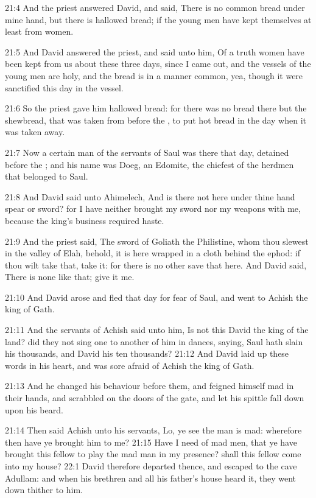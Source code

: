 21:4 And the priest answered David, and said, There is no common bread under mine hand, but there is hallowed bread; if the young men have kept themselves at least from women.

21:5 And David answered the priest, and said unto him, Of a truth women have been kept from us about these three days, since I came out, and the vessels of the young men are holy, and the bread is in a manner common, yea, though it were sanctified this day in the vessel.

21:6 So the priest gave him hallowed bread: for there was no bread there but the shewbread, that was taken from before the \LORD, to put hot bread in the day when it was taken away.

21:7 Now a certain man of the servants of Saul was there that day, detained before the \LORD; and his name was Doeg, an Edomite, the chiefest of the herdmen that belonged to Saul.

21:8 And David said unto Ahimelech, And is there not here under thine hand spear or sword? for I have neither brought my sword nor my weapons with me, because the king's business required haste.

21:9 And the priest said, The sword of Goliath the Philistine, whom thou slewest in the valley of Elah, behold, it is here wrapped in a cloth behind the ephod: if thou wilt take that, take it: for there is no other save that here. And David said, There is none like that; give it me.

21:10 And David arose and fled that day for fear of Saul, and went to Achish the king of Gath.

21:11 And the servants of Achish said unto him, Is not this David the king of the land? did they not sing one to another of him in dances, saying, Saul hath slain his thousands, and David his ten thousands?  21:12 And David laid up these words in his heart, and was sore afraid of Achish the king of Gath.

21:13 And he changed his behaviour before them, and feigned himself mad in their hands, and scrabbled on the doors of the gate, and let his spittle fall down upon his beard.

21:14 Then said Achish unto his servants, Lo, ye see the man is mad: wherefore then have ye brought him to me?  21:15 Have I need of mad men, that ye have brought this fellow to play the mad man in my presence? shall this fellow come into my house?  22:1 David therefore departed thence, and escaped to the cave Adullam: and when his brethren and all his father's house heard it, they went down thither to him.

